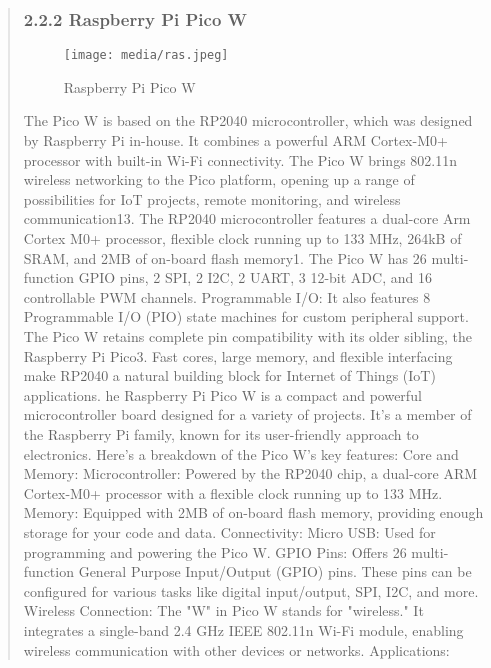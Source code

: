 \documentclass[12pt]{report}
\begin{document}
\begin{quote}
			
				\subsubsection{2.2.2 Raspberry Pi Pico W}
				\begin{figure}[h]
					\centering
					\texttt{[image: media/ras.jpeg]}\\
					\caption{Raspberry Pi Pico W}
				\end{figure}
				The Pico W is based on the RP2040 microcontroller, which was designed by Raspberry Pi in-house. It combines a powerful ARM Cortex-M0+ processor with built-in Wi-Fi connectivity. The Pico W brings 802.11n wireless  networking to the Pico platform, opening up a range of possibilities for IoT projects, remote monitoring, and wireless communication13. The RP2040 microcontroller features a dual-core Arm Cortex M0+ processor, flexible clock running up to 133 MHz, 264kB of SRAM, and 2MB of on-board flash memory1. The Pico W has 26 multi-function GPIO pins, 2 SPI, 2 I2C, 2 UART, 3 12-bit ADC, and 16 controllable PWM channels. Programmable I/O: It also features 8 Programmable I/O (PIO) state machines for custom peripheral support. The Pico W retains complete pin compatibility with its older sibling, the Raspberry Pi Pico3. Fast cores, large memory, and flexible interfacing make RP2040 a natural building block for Internet of Things (IoT) applications.
				he Raspberry Pi Pico W is a compact and powerful microcontroller board designed for a variety of projects. It's a member of the Raspberry Pi family, known for its user-friendly approach to electronics. Here's a breakdown of the Pico W's key features:
				Core and Memory:
				Microcontroller: Powered by the RP2040 chip, a dual-core ARM Cortex-M0+ processor with a flexible clock running up to 133 MHz.
				Memory: Equipped with 2MB of on-board flash memory, providing enough storage for your code and data.
				Connectivity:
				Micro USB: Used for programming and powering the Pico W.
				GPIO Pins: Offers 26 multi-function General Purpose Input/Output (GPIO) pins. These pins can be configured for various tasks like digital input/output, SPI, I2C, and more.
				Wireless Connection: The "W" in Pico W stands for "wireless." It integrates a single-band 2.4 GHz IEEE 802.11n Wi-Fi module, enabling wireless communication with other devices or networks.
				Applications:

\end{quote}
\end{document}
